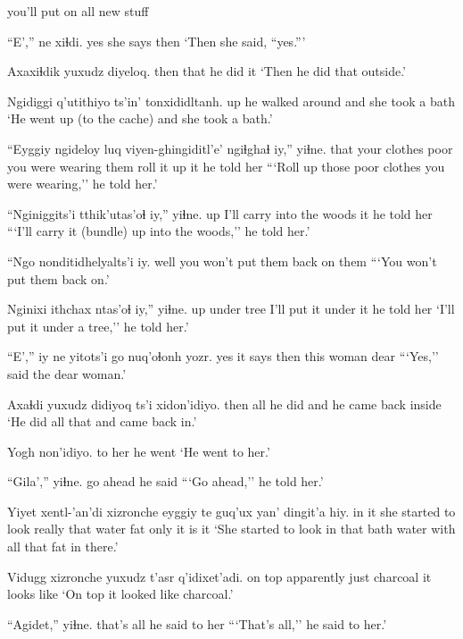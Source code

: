 \documentclass[12pt]{article}
\begin{document}
you'll put on all new stuff

\gll ``E',''  ne       xiɬdi.
yes {she says} then
\glt `Then she said, ``yes.'''
\glend

\gll Axaxiɬdik yuxudz diyeloq.
then      that   {he did it} 
\glt `Then he did that outside.'
\glend

\gll Ngidiggi q'utithiyo      ts'in' tonxididltanh.
up {he walked around} and  {she took a bath}
\glt `He went up (to the cache) and she took a bath.' 
\glend

\gll ``Eyggiy ngideloy     luq  viyen-ghingiditl'e'   ngiɬghaɬ   iy,'' yiɬne.
that   {your clothes} poor {you were wearing them} {roll it up} it {he told her}
\glt ```Roll up those poor clothes you were wearing,'' he told her.'
\glend

\gll ``Nginiggits'i tthik'utas'oɬ             iy,'' yiɬne.
up           {I'll carry into the woods} it  {he told her    }
\glt ```I'll carry it (bundle) up into the woods,'' he told her.'
\glend

\gll ``Ngo  {nonditidhelyalts'i}        iy.
well {you won't put them back on} them
\glt ```You won't put them back on.'
\glend

\gll Nginixi ithchax    ntas'oɬ           iy,'' yiɬne.
up      {under tree} {I'll put it under} it {he told her}
\glt `I'll put it under a tree,'' he told her.'
\glend

\gll ``E','' iy ne   yitots'i go   nuq'oɬonh yozr.
yes it says then       this woman     dear
\glt ```Yes,'' said the dear woman.'
\glend

\gll Axaɬdi yuxudz didiyoq ts'i xidon'idiyo. 
then   all    {he did}  and  {he came back inside}
\glt `He did all that and came back in.'
\glend

\gll Yogh non'idiyo.
{to her} {he went}
\glt `He went to her.'
\glend

\gll ``Gila','' yiɬne.
{go ahead}  {he said}
\glt ```Go ahead,'' he told her.'
\glend

\gll Yiyet xentl-'an'di xizronche eyggiy te    guq'ux yan' dingit'a hiy.
{in it} {she started to look} really     that   water fat    only {it is}    it
\glt `She started to look in that bath water with all that fat in there.'
\glend

\gll Vidugg xizronche yuxudz t'asr    q'idixet'adi.
{on top} apparently just  charcoal {it looks like }
\glt `On top it looked like charcoal.'
\glend

\gll ``Agidet,'' yiɬne.
{that's all} {he said to her}
\glt ```That's all,'' he said to her.'
\glend
\end{document}
